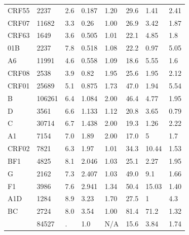 \documentclass[utf8]{FrontiersinHarvard} %
\begin{document}
\begin{table}[h!]
\begin{small}
\begin{tabular}{llllllll}
			CRF55                          & 2237  & 2.6    & 0.187                         & 1.20     & 29.6          & 1.41   & 2.41 \\ CRF07 & 11682 & 3.3  &
			0.26                           & 1.00  & 26.9   & 3.42                          & 1.87                                     \\ CRF63 & 1649                    & 3.6 & 0.505 & 1.01 & 22.1 &
			4.85                           & 1.8                                                                                       \\ 01B & 2237 & 7.8 & 0.518 & 1.08 & 22.2 & 0.97 & 5.05 \\ A6    &
			11991                          & 4.6   & 0.558  & 1.09                          & 18.6     & 5.55          & 1.6           \\ CRF08 & 2538 & 3.9  & 0.82                     &
			1.95                           & 25.6  & 1.95   & 2.12                                                                     \\ CRF01 & 25689 & 5.1 & 0.875 & 1.73 & 47.0 & 1.94 &
			5.54                                                                                                                       \\ B & 106261 & 6.4 & 1.084 & 2.00 & 46.4 & 4.77 & 1.95 \\ D & 3561  & 6.6
			                               & 1.133 & 1.12   & 20.8                          & 3.65     & 0.79                          \\ C    & 30714                    & 6.7 & 1.438 & 2.00 & 19.3 &
			1.26                           & 2.22                                                                                      \\ A1 & 7154 & 7.0 & 1.89 & 2.00 & 17.0 & 5 & 1.7 \\ CRF02 & 7821 &
			6.3                            & 1.97  & 1.01   & 34.3                          & 10.44    & 1.53                          \\ BF1  & 4825 & 8.1                      & 2.046 & 1.03 &
			25.1                           & 2.27  & 1.95                                                                              \\ G & 2162 & 7.3 & 2.407 & 1.03 & 49.0 & 9.1 & 1.66\\ F1   &
			3986                           & 7.6   & 2.941  & 1.34                          & 50.4     & 15.03         & 1.40          \\ A1D  & 1284 & 8.9 & 3.23                    &
			1.70                           & 27.5  & 1      & 4.3                                                                      \\ BC & 2724 & 8.0 & 3.54 & 1.00 & 81.4 & 71.2 & 1.32 \\
			\hline \citet{Wertheim:2014aa} & 84527 & .      & 1.0                           & N/A      & 15.6          & 3.84   & 1.74 \\
			\hline

			\hline
		\end{tabular}
	\end{small}
\end{table}
\end{document}
